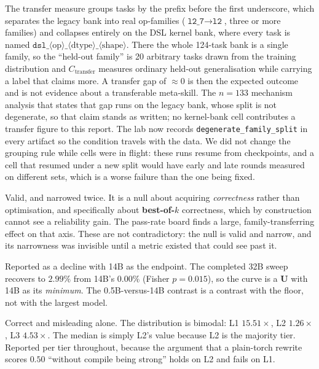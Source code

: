 \begin{description}[leftmargin=1.4em,style=nextline]
\item[{Held-family transfer, on the DSL kernel bank only.}]
  The transfer measure groups tasks by the prefix before the first underscore, which separates
  the legacy bank into real op-families ($\texttt{l2\_7}\rightarrow\texttt{l2}$, three or more
  families) and collapses entirely on the DSL kernel bank, where every task is named
  $\texttt{dsl\_}\langle\text{op}\rangle\texttt{\_}\langle\text{dtype}\rangle\texttt{\_}\langle\text{shape}\rangle$.
  There the whole 124-task bank is a single family, so the ``held-out family'' is 20 arbitrary
  tasks drawn from the training distribution and $C_{\mathrm{transfer}}$ measures ordinary
  held-out generalisation while carrying a label that claims more. A transfer gap of
  $\approx 0$ is then the expected outcome and is not evidence about a transferable meta-skill.
  The $n=133$ mechanism analysis that states that gap runs on the legacy bank, whose split is
  not degenerate, so that claim stands as written; no kernel-bank cell contributes a transfer
  figure to this report. The lab now records \texttt{degenerate\_family\_split} in every
  artifact so the condition travels with the data. We did not change the grouping rule while
  cells were in flight: these runs resume from checkpoints, and a cell that resumed under a new
  split would have early and late rounds measured on different sets, which is a worse failure
  than the one being fixed.

\item[{The compounding null ($n=57$ trajectories, \bfz{}$\,{=}\,5.6$).}]
  Valid, and narrowed twice. It is a null about acquiring \emph{correctness} rather than
  optimisation, and specifically about \textbf{best-of-$k$} correctness, which by construction
  cannot see a reliability gain. The pass-rate board finds a large, family-transferring effect on
  that axis. These are not contradictory: the null is valid and narrow, and its narrowness was
  invisible until a metric existed that could see past it.

\item[{T1-kernel shape across scale.}]
  Reported as a decline with 14B as the endpoint. The completed 32B sweep recovers to $2.99\%$
  from 14B's $0.00\%$ (Fisher $p = 0.015$), so the curve is a \textbf{U} with 14B as its
  \emph{minimum}. The 0.5B-versus-14B contrast is a contrast with the floor, not with the largest
  model.

\item[{Compile-gain ``$1.34\times$ median''.}]
  Correct and misleading alone. The distribution is bimodal: L1 $15.51\times$, L2 $1.26\times$,
  L3 $4.53\times$. The median is simply L2's value because L2 is the majority tier. Reported per
  tier throughout, because the argument that a plain-torch rewrite scores $0.50$ ``without
  compile being strong'' holds on L2 and fails on L1.
\end{description}

